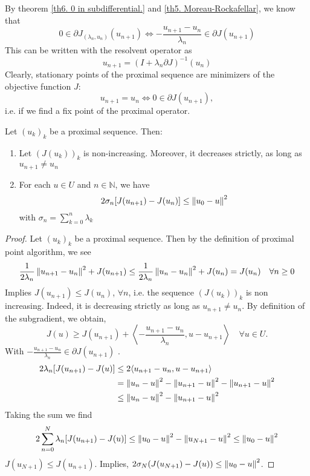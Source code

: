By theorem \ref{th6. 0 in subdifferential.} and \ref{th5. Moreau-Rockafellar}, we know that
\[
	0 \in \partial J_{(\lambda_n, u_n)}(u_{n+1}) \iff -\frac{u_{n+1}-u_n}{\lambda_n} \in \partial J(u_{n+1})
\]
This can be written with the resolvent operator as
\[
	u_{n+1}=(I+\lambda_n \partial J)^{-1} (u_n)
\]
Clearly, stationary points of the proximal sequence are minimizers of the objective function $J$:
\[
	u_{n+1}=u_n \iff 0 \in \partial J(u_{n+1}),
\]
i.e. if we find a fix point of the proximal operator.
\begin{lemma}
	\label{lemma11. Proximal sequence.}
	Let $(u_k)_k$ be a proximal sequence. Then:
	\begin{enumerate}
		\item Let $(J(u_k))_k$ is non-increasing. Moreover, it decreases strictly, as long as $u_{n+1} \neq u_n$
		\item For each $u\in U$ and $n\in \mathbb{N}$, we have 
		\[
			2 \sigma_n [J(u_{n+1})-J(u_n)] \leq \left\lVert u_0 - u \right\rVert^2
		\]
		with $\sigma_n = \sum_{k=0}^{n} \lambda_k$
	\end{enumerate}
	\begin{proof}
		Let $(u_k)_k$ be a proximal sequence. Then by the definition of proximal point algorithm, we see
		\[
			\frac{1}{2\lambda_n}\left\lVert u_{n+1}-u_n\right\rVert^2 + J(u_{n+1}) \leq \frac{1}{2\lambda_n}\left\lVert u_{n}-u_n\right\rVert^2 + J(u_{n}) = J(u_n) \quad \forall n \geq 0
		\]
		Implies $J(u_{n+1}) \leq J(u_n)$, $\forall n$, i.e. the sequence $(J(u_k))_k$ is non increasing. Indeed, it is decreasing strictly as long as $u_{n+1}\neq u_{n}$.
		By definition of the subgradient, we obtain,
		\begin{equation*}
			J(u) \geq J(u_{n+1}) + \left\langle -\frac{u_{n+1}-u_n}{\lambda_n} , u-u_{n+1} \right\rangle  \quad \forall u \in U.
		\end{equation*}
		With $-\frac{u_{n+1}-u_n}{\lambda_n} \in \partial J(u_{n+1})$ .
		\begin{align*}
			2\lambda_n [J(u_{n+1})-J(u)] &\leq 2 \langle u_{n+1}-u_n, u-u_{n+1}\rangle \\
			&= \left\lVert u_n-u\right\rVert^2 -\left\lVert u_{n+1}-u\right\rVert^2 -\left\lVert u_{n+1}-u\right\rVert^2 \\
			&\leq \left\lVert u_n-u\right\rVert^2 - \left\lVert u_{n+1}-u\right\rVert^2
		\end{align*}
		Taking the sum we find
		\begin{align*}
			2\sum_{n=0}^{N} \lambda_n [J(u_{n+1})-J(u)] \leq \left\lVert u_0-u\right\rVert^2 - \left\lVert u_{N+1}-u\right\rVert^2 \leq \left\lVert u_0 - u\right\rVert^2
		\end{align*}
		$J(u_{N+1}) \leq J(u_{n+1}) $.
		Implies, $2\sigma_N (J(u_{N+1})-J(u)) \leq \left\lVert u_0 - u\right\rVert^2$.
	\end{proof}
\end{lemma}

